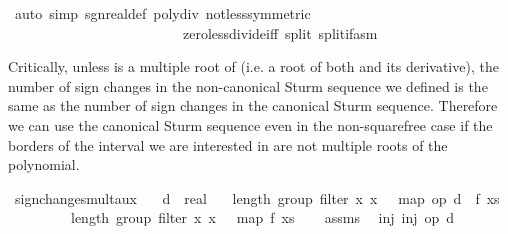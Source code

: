\begin{isabellebody}
\ {\isacharparenleft}auto\ simp{\isacharcolon}\ sgn{\isacharunderscore}real{\isacharunderscore}def\ poly{\isacharunderscore}div\ not{\isacharunderscore}less{\isacharbrackleft}symmetric{\isacharbrackright}\ \isanewline
\ \ \ \ \ \ \ \ \ \ \ \ \ \ \ \ \ \ \ \ \ \ \ \ \ zero{\isacharunderscore}less{\isacharunderscore}divide{\isacharunderscore}iff\ split{\isacharcolon}\ split{\isacharunderscore}if{\isacharunderscore}asm{\isacharparenright}\isanewline
\ \ \isamarkupfalse%
\isanewline
{}\isamarkupfalse%
%
\endisatagproof
{\isafoldproof}%
%
\isadelimproof
%
\endisadelimproof
%
\begin{isamarkuptext}%
Critically, unless  is a multiple root of  
  (i.e. a root of both  and its derivative), the number 
  of sign changes in the non-canonical Sturm sequence we defined 
  is the same as the number of sign changes in the canonical Sturm 
  sequence. Therefore we can use the canonical Sturm sequence 
  even in the non-squarefree case if the borders of the interval 
  we are interested in are not multiple roots of the polynomial.%
\end{isamarkuptext}%
\isamarkuptrue%
\isamarkupfalse%
\ sign{\isacharunderscore}changes{\isacharunderscore}mult{\isacharunderscore}aux{\isacharcolon}\isanewline
\ \ \ {\isachardoublequoteopen}d\ {\isasymnoteq}\ {\isacharparenleft}{}{\isacharcolon}{\isacharcolon}real{\isacharparenright}{\isachardoublequoteclose}\isanewline
\ \ \ {\isachardoublequoteopen}length\ {\isacharparenleft}group\ {\isacharparenleft}filter\ {\isacharparenleft}{\isasymlambda}x{\isachardot}\ x\ {\isasymnoteq}\ {}{\isacharparenright}\ {\isacharparenleft}map\ {\isacharparenleft}op\ {\isacharasterisk}d\ {\isasymcirc}\ f{\isacharparenright}\ xs{\isacharparenright}{\isacharparenright}{\isacharparenright}\ {\isacharequal}\isanewline
\ \ \ \ \ \ \ \ \ length\ {\isacharparenleft}group\ {\isacharparenleft}filter\ {\isacharparenleft}{\isasymlambda}x{\isachardot}\ x\ {\isasymnoteq}\ {}{\isacharparenright}\ {\isacharparenleft}map\ f\ xs{\isacharparenright}{\isacharparenright}{\isacharparenright}{\isachardoublequoteclose}\isanewline
%
\isadelimproof
%
\endisadelimproof
%
\isatagproof
{}\isamarkupfalse%
{\isacharminus}\isanewline
\ \ \isamarkupfalse%
\ assms\ \isamarkupfalse%
\ inj{\isacharcolon}\ {\isachardoublequoteopen}inj\ {\isacharparenleft}op\ {\isacharasterisk}d{\isacharparenright}{\isachardoublequoteclose}\ \isamarkupfalse%

\end{isabellebody}
